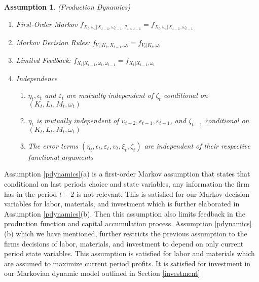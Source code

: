 \documentclass{article}
\newtheorem{assump}{Assumption}[section]
\begin{document}
\begin{assump}(Production Dynamics)\label{pdynamics}
~
    \begin{enumerate}[label=(\roman*)]
        \item \textit{First-Order Markov} $f_{X_{t}, \omega_{t}|X_{t-1}, \omega_{t-1}, \mathcal{I}_{t<t-1}}=f_{X_{t}, \omega_{t}|X_{t-1}, \omega_{t-1}}$
        \item \textit{Markov Decision Rules:} $f_{V_{t}|K_{t}, X_{t-1}, \omega_{t}}=f_{V_{t}|K_{t}, \omega_{t}}$
        \item \textit{Limited Feedback:} $f_{X_{t}|X_{t-1}, \omega_{t}, \omega_{t-1}}=f_{X_{t}|X_{t-1}, \omega_{t}}$
        \item \textit{Independence}
        \begin{enumerate}[label=(\alph*)] 
            \item $\eta_{t}, \epsilon_{t}$ and $\varepsilon_{t}$ are mutually independent of $\zeta_{t}$ conditional on $(K_{t}, L_{t}, M_{t}, \omega_{t})$
            \item $\eta_{t}$ is mutually independent of $\upsilon_{t-2}, \epsilon_{t-1}, \varepsilon_{t-1}$, and $\zeta_{t-1}$ conditional on $(K_{t}, L_{t}, M_{t}, \omega_{t})$
            \item The error terms $(\eta_{t}, \epsilon_{t}, \varepsilon_{t}, \upsilon_{t}, \xi_{t}, \zeta_{t})$ are independent of their respective functional arguments
        \end{enumerate}
    \end{enumerate}
\end{assump}

Assumption \eqref{pdynamics}(a) is a first-order Markov assumption that states that conditional on last periods choice and state variables, any information the firm has in the period $t-2$ is not relevant. This is satisfied for our Markov decision variables for labor, materials, and investment which is further elaborated in Assumption \eqref{pdynamics}(b). Then this assumption also limits feedback in the production function and capital accumulation process. Assumption \eqref{pdynamics}(b) which we have mentioned, further restricts the previous assumption to the firms decisions of labor, materials, and investment to depend on only current period state variables. This assumption is satisfied for labor and materials which are assumed to maximize current period profits. It is satisfied for investment in our Markovian dynamic model outlined in Section \eqref{investment}\\
\end{document}
